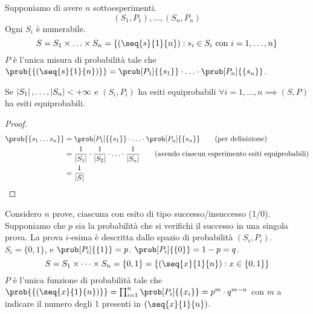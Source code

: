 
Supponiamo di avere $n$ sottoesperimenti.
\[
(S_1, P_1), \ldots, (S_n, P_n)
\]
Ogni $S_i$ \`e numerabile.
\[
S = S_1 \times \ldots \times S_n = \{ (\seq{s}{1}{n}) : s_i \in S_i \text{ con } i = 1, \ldots, n \}
\]
$P$ \`e l'unica misura di probabilit\`a tale che $\prob{\{(\seq{s}{1}{n})\}} = \prob[P_1]{\{s_1\}} \cdot \ldots \cdot \prob[P_n]{\{s_n\}}$.

\begin{prop}
Se $\left\lvert{S_1}\right\rvert, \ldots, \left\lvert{S_n}\right\rvert < + \infty$ e $(S_i, P_i)$  ha esiti equiprobabili $\forall  i = 1, \ldots, n \implies (S, P)$ ha esiti equiprobabili.
\end{prop}
\begin{proof}
\begin{align*}
\prob{\{s_1 \ldots s_n\}} &= \prob[P_1]{\{s_1\}} \cdot \ldots \cdot \prob[P_n]{\{s_n\}} \tag{per definizione} \\
&= \frac{1}{\abs{S_1}} \cdot \frac{1}{\abs{S_2}} \cdot \ldots \cdot \frac{1}{\abs{S_n}} \tag{avendo ciascun esperimento esiti equiprobabili} \\
&= \frac{1}{\abs{S}}
\end{align*}
\end{proof}

Considero $n$ prove, ciascuna con esito di tipo successo/insuccesso (1/0). Supponiamo che $p$ sia la probabilit\`a che si verifichi il successo in una singola prova. La prova $i$-esima \`e descritta dallo spazio di probabilit\`a $(S_i, P_i)$. $S_i = \{0,1\}$, e $\prob[P_i]{\{1\}} = p$. $\prob[P_i]{\{0\}} = 1 - p = q$.
\[
S = S_1 \times \dots \times S_n = \{0,1\} = \{ (\seq{x}{1}{n}) : x \in \{ 0, 1 \}\}
\]
$P$ \`e l'unica funzione di probabilit\`a tale che $\prob{\{(\seq{x}{1}{n})\}} = \prod_{i = 1}^{n} \prob[P_i]{\{x_i\}} = p^m \cdot q^{m-n}$ con $m $ a indicare il numero degli 1 presenti in $(\seq{x}{1}{n})$.

